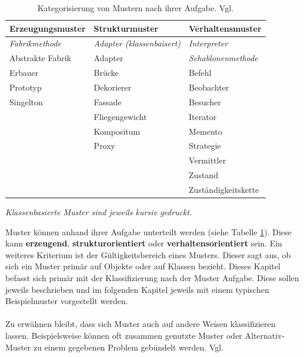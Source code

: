 \documentclass[fontsize=11pt,a4paper,final]{scrreprt}[2003/01/01]
\begin{document}
\begin{table}[H]
	\caption{Kategorisierung von Mustern nach ihrer Aufgabe. Vgl. \cite[S. 14]{gamma2004}}\label{ta:Klassifizierung}
	\begin{center}
		\begin{tabular}{|l|l|l|}
			\hline
			\bf Erzeugungsmuster   & \bf Strukturmuster                & \bf Verhaltensmuster       \\
			\hline
			\textit{Fabrikmethode} & \textit{Adapter (klassenbaisert)} & \textit{Interpreter}       \\
			Abstrakte Fabrik       & Adapter                           & \textit{Schablonenmethode} \\
			Erbauer                & Brücke                           & Befehl                     \\
			Prototyp               & Dekorierer                        & Beobachter                 \\
			Singelton              & Fassade                           & Besucher                   \\
			                       & Fliegengewicht                    & Iterator                   \\
			                       & Kompositum                        & Memento                    \\
			                       & Proxy                             & Strategie                  \\
			                       &                                   & Vermittler                 \\
			                       &                                   & Zustand                    \\
			                       &                                   & Zuständigkeitskette       \\
			\hline
		\end{tabular}
	\end{center}
	\begin{center}
		\small{\textit{Klassenbasierte Muster sind jeweils kursiv gedruckt.}}
	\end{center}
\end{table}

Muster können anhand ihrer Aufgabe unterteilt werden (siehe Tabelle \ref{ta:Klassifizierung}). Diese kann \textbf{erzeugend},\textbf{ strukturorientiert} oder \textbf{verhaltensorientiert} sein. Ein weiteres Kriterium ist der Gültigkeitsbereich eines Musters. Dieser sagt aus, ob sich ein Muster primär auf Objekte oder auf Klassen bezieht.
Dieses Kapitel befasst sich primär mit der Klassifizierung nach der Muster Aufgabe. Diese sollen jeweils beschrieben und im folgenden Kapitel jeweils mit einem typischen Beispielmuster vorgestellt werden. 
\\ \\
Zu erwähnen bleibt, dass sich Muster auch auf andere Weisen klassifizieren lassen. Beispielsweise können oft zusammen genutzte Muster oder Alternativ-Muster zu einem gegebenen Problem gebündelt werden. Vgl. \cite[S. 14]{gamma2004}
\end{document}

